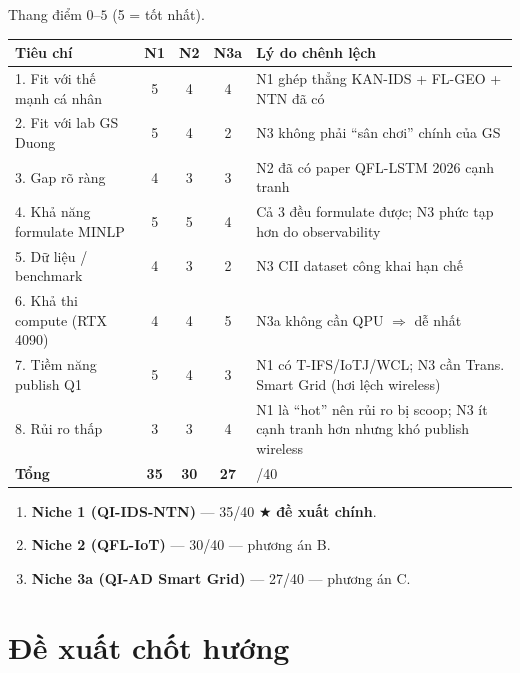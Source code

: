 \documentclass[11pt,a4paper]{article}
\begin{document}
Thang điểm $0$--$5$ (5 = tốt nhất).

\begin{longtable}{@{}p{5.5cm} c c c p{3cm}@{}}
\toprule
\textbf{Tiêu chí} & \textbf{N1} & \textbf{N2} & \textbf{N3a} & \textbf{Lý do chênh lệch} \\
\midrule
\endhead
1. Fit với thế mạnh cá nhân & 5 & 4 & 4 & N1 ghép thẳng KAN-IDS + FL-GEO + NTN đã có \\
2. Fit với lab GS Duong & 5 & 4 & 2 & N3 không phải ``sân chơi'' chính của GS \\
3. Gap rõ ràng & 4 & 3 & 3 & N2 đã có paper QFL-LSTM 2026 cạnh tranh \\
4. Khả năng formulate MINLP & 5 & 5 & 4 & Cả 3 đều formulate được; N3 phức tạp hơn do observability \\
5. Dữ liệu / benchmark & 4 & 3 & 2 & N3 CII dataset công khai hạn chế \\
6. Khả thi compute (RTX 4090) & 4 & 4 & 5 & N3a không cần QPU $\Rightarrow$ dễ nhất \\
7. Tiềm năng publish Q1 & 5 & 4 & 3 & N1 có T-IFS/IoTJ/WCL; N3 cần Trans. Smart Grid (hơi lệch wireless) \\
8. Rủi ro thấp & 3 & 3 & 4 & N1 là ``hot'' nên rủi ro bị scoop; N3 ít cạnh tranh hơn nhưng khó publish wireless \\
\midrule
\textbf{Tổng} & \textbf{35} & \textbf{30} & \textbf{27} & /40 \\
\bottomrule
\end{longtable}

\begin{goldbox}
\begin{enumerate}
  \item \textbf{Niche 1 (QI-IDS-NTN)} --- 35/40 $\bigstar$ \textbf{đề xuất chính}.
  \item \textbf{Niche 2 (QFL-IoT)} --- 30/40 --- phương án B.
  \item \textbf{Niche 3a (QI-AD Smart Grid)} --- 27/40 --- phương án C.
\end{enumerate}
\end{goldbox}

\section{Đề xuất chốt hướng}
\end{document}
